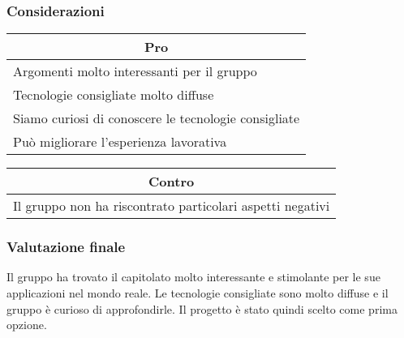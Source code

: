 \subsubsection{Considerazioni}
\begin{minipage}[t]{0.45\linewidth}
    \vspace{0pt}
    {\renewcommand{\arraystretch}{1.5}
    \begin{tabular}{p{1\linewidth}}
        \multicolumn{1}{c}{\textbf{Pro}}                        \\
        \midrule
        Argomenti molto interessanti per il gruppo              \\
        Tecnologie consigliate molto diffuse                    \\
        Siamo curiosi di conoscere le tecnologie consigliate    \\
        Può migliorare l'esperienza lavorativa                  \\
        \hline
    \end{tabular}
    }
\end{minipage}
\hspace{0.05\linewidth}
\begin{minipage}[t]{0.45\linewidth}
    \vspace{0pt}
    {\renewcommand{\arraystretch}{1.5}
    \begin{tabular}{p{1\linewidth}}
        \multicolumn{1}{c}{\textbf{Contro}} \\
        \midrule
        Il gruppo non ha riscontrato particolari aspetti negativi \\
        \hline
    \end{tabular}
    }
\end{minipage}
\vspace{1em}

\subsubsection{Valutazione finale}
Il gruppo ha trovato il capitolato molto interessante e stimolante per le sue applicazioni nel mondo reale. 
Le tecnologie consigliate sono molto diffuse e il gruppo è curioso di approfondirle. 
Il progetto è stato quindi scelto come prima opzione.